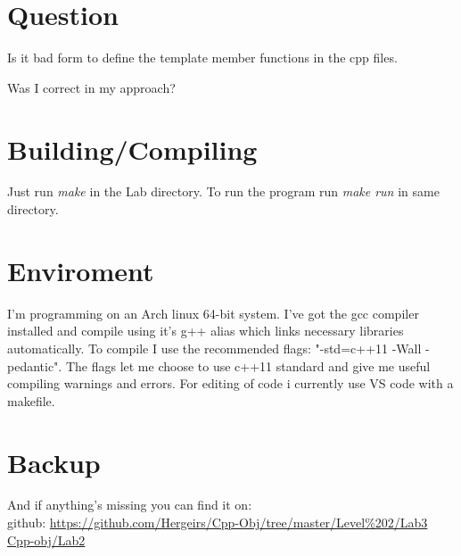 \documentclass[11pt]{article}
\begin{document}
\section{Question}
Is it bad form to define the template member functions in the cpp files.

Was I correct in my approach?

\section{Building/Compiling}
Just run \emph{make} in the Lab directory.
To run the program run \emph{make run} in same directory.

\section{Enviroment}
I'm programming on an Arch linux 64-bit system. I've got the gcc compiler installed and compile using it's g++ alias which links necessary libraries automatically. To compile I use the recommended flags: "-std=c++11 -Wall -pedantic". The flags let me choose to use c++11 standard and give me useful compiling warnings and errors. 
For editing of code i currently use VS code with a makefile.

\section{Backup}
And if anything's missing you can find it on: \\
github: \url{https://github.com/Hergeirs/Cpp-Obj/tree/master/Level%202/Lab3} \\
\href{https://github.com/Hergeirs/Cpp-Obj/tree/master/Level%202/Lab3}{Cpp-obj/Lab2}

\flushright{\today}
\end{document}
